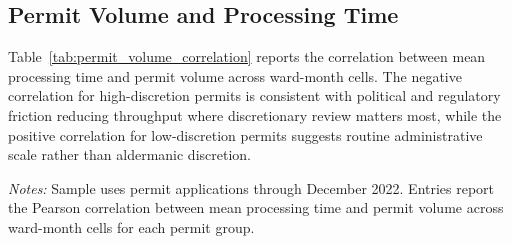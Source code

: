 \subsection{Permit Volume and Processing Time}

Table~\ref{tab:permit_volume_correlation} reports the correlation between mean processing time and permit volume across ward-month cells.
The negative correlation for high-discretion permits is consistent with political and regulatory friction reducing throughput where discretionary review matters most, while the positive correlation for low-discretion permits suggests routine administrative scale rather than aldermanic discretion.

\begin{table}[htbp]
    \centering
    \caption{Processing Time and Permit Volume Correlation}
    \label{tab:permit_volume_correlation}
    

    \footnotesize
    \textit{Notes:} Sample uses permit applications through December 2022.
    Entries report the Pearson correlation between mean processing time and permit volume across ward-month cells for each permit group.
\end{table}
